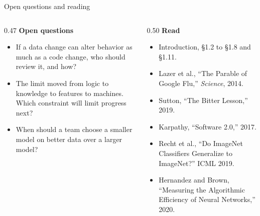 \documentclass[aspectratio=169, 12pt]{beamer}
\begin{document}
\begin{frame}{Open questions and reading}
  \begin{columns}[T]
    \begin{column}{0.47\textwidth}
      \small\textbf{Open questions}
      \begin{itemize}\setlength{\itemsep}{0.1cm}
        \item If a data change can alter behavior as much as a code change, who should review it, and how?
        \item The limit moved from logic to knowledge to features to machines. Which constraint will limit progress next?
        \item When should a team choose a smaller model on better data over a larger model?
      \end{itemize}
    \end{column}
    \begin{column}{0.50\textwidth}
      \small\textbf{Read}
      \begin{itemize}\setlength{\itemsep}{0pt}\setlength{\parskip}{0pt}\footnotesize
        \item Introduction, \S1.2 to \S1.8 and \S1.11.
        \item Lazer et al., ``The Parable of Google Flu,'' \emph{Science}, 2014.
        \item Sutton, ``The Bitter Lesson,'' 2019.
        \item Karpathy, ``Software 2.0,'' 2017.
        \item Recht et al., ``Do ImageNet Classifiers Generalize to ImageNet?'' ICML 2019.
        \item Hernandez and Brown, ``Measuring the Algorithmic Efficiency of Neural Networks,'' 2020.
      \end{itemize}
    \end{column}
  \end{columns}
\end{frame}
\end{document}
